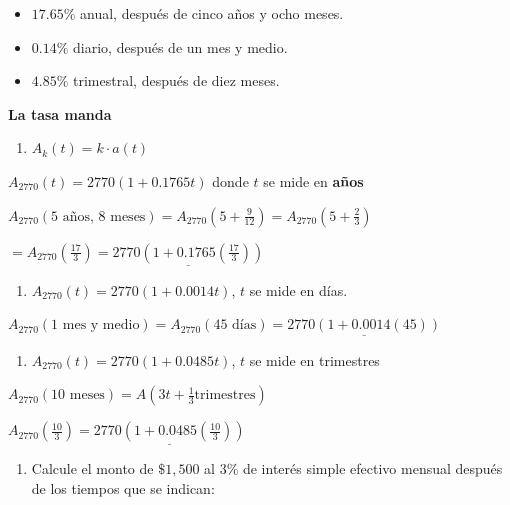 \documentclass[
]{book}
\providecommand{\tightlist}{%
  \setlength{\itemsep}{0pt}\setlength{\parskip}{0pt}}
\theoremstyle{definition}
\theoremstyle{definition}
\theoremstyle{definition}
\theoremstyle{definition}
\theoremstyle{remark}
\begin{document}
\begin{itemize}
\tightlist
\item
  \(17.65 \%\) anual, después de cinco años y ocho meses.
\item
  \(0.14 \%\) diario, después de un mes y medio.
\item
  \(4.85 \%\) trimestral, después de diez meses.
\end{itemize}

\textbf{La tasa manda}

\begin{enumerate}
\def\labelenumi{\alph{enumi})}
\tightlist
\item
  \(A_k(t) = k\cdot a(t)\)
\end{enumerate}

\(A_{2770}(t) = 2770(1+0.1765t)\) donde \(t\) se mide en \textbf{años}

\(A_{2770}(\text{5 años, 8 meses}) = A_{2770}\left(5+\frac{9}{12} \right)=A_{2770}\left( 5 + \frac{2}{3}\right)\)

\(= A_{2770}\left( \frac{17}{3}\right) = \underline{2770 \left( 1+0.1765\left( \frac{17}{3}\right) \right)}\)

\begin{enumerate}
\def\labelenumi{\alph{enumi})}
\setcounter{enumi}{1}
\tightlist
\item
  \(A_{2770}(t) = 2770(1+0.0014t)\), \(t\) se mide en días.
\end{enumerate}

\(A_{2770} (\text{1 mes y medio}) = A_{2770}(\text{45 días}) = \underline{2770(1+0.0014(45))}\)

\begin{enumerate}
\def\labelenumi{\alph{enumi})}
\setcounter{enumi}{2}
\tightlist
\item
  \(A_{2770}(t)=2770(1+0.0485t)\), \(t\) se mide en trimestres
\end{enumerate}

\(A_{2770}(\text{10 meses}) = A\left(3t +\frac{1}{3} \text{trimestres}\right)\)

\(A_{2770}\left(\frac{10}{3} \right) = \underline{2770\left( 1+0.0485\left(\frac{10}{3} \right) \right)}\)

\begin{enumerate}
\def\labelenumi{\arabic{enumi}.}
\setcounter{enumi}{1}
\tightlist
\item
  Calcule el monto de \(\$1,500\) al \(3\%\) de interés simple efectivo mensual después de los tiempos que se indican:
\end{enumerate}
\end{document}
